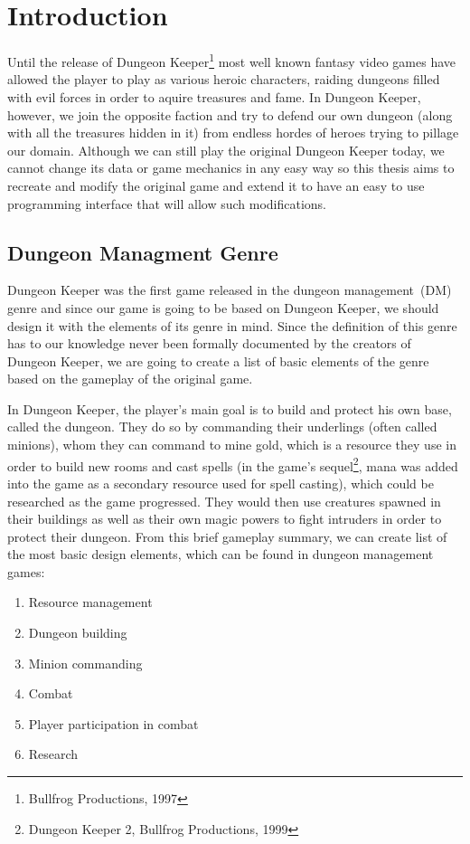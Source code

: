 \chapter{Introduction}

Until the release of Dungeon Keeper\footnote{Bullfrog Productions, 1997} most well known fantasy 
video games have allowed the player to play as various heroic characters, raiding dungeons filled
with evil forces in order to aquire treasures and fame.
In Dungeon Keeper, however, we join the opposite faction and try to defend our own dungeon
(along with all the treasures hidden in it) from endless hordes of heroes trying to pillage our domain.
Although we can still play the original Dungeon Keeper today, we cannot change its data or game mechanics
in any easy way so this thesis aims to recreate and modify the original game and extend it to have an easy to 
use programming interface that will allow such modifications.

\section{Dungeon Managment Genre}

Dungeon Keeper was the first game released in the dungeon management~(DM) genre and since our game is going to be based on
Dungeon Keeper, we should design it with the elements of its genre in mind. Since the definition of this genre has to our
knowledge never been formally documented by the creators of Dungeon Keeper, we are going to create a list of basic elements
of the genre based on the gameplay of the original game.

In Dungeon Keeper, the player's main goal is to build and protect his own base, called the dungeon. They do so by commanding
their underlings (often called minions), whom they can command to mine gold, which is a resource they use in order to build new rooms
and cast spells (in the game's sequel\footnote{Dungeon Keeper 2, Bullfrog Productions, 1999}, mana was added into the game
as a secondary resource used for spell casting), which could be researched as the game progressed. They would then use creatures
spawned in their buildings as well as their own magic powers to fight intruders in order to protect their dungeon. 
From this brief gameplay summary, we can create list of the most basic design elements, which can be found in dungeon management games:

\begin{enumerate}[label=\textbf{(E\arabic*)}]
    \item Resource management
    \item Dungeon building
    \item Minion commanding
    \item Combat
    \item Player participation in combat
    \item Research
\end{enumerate}

